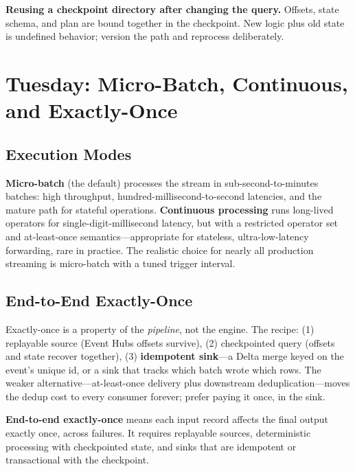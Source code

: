 \begin{pitfall}
\textbf{Reusing a checkpoint directory after changing the query.} Offsets, state schema, and plan are bound together in the checkpoint. New logic plus old state is undefined behavior; version the path and reprocess deliberately.
\end{pitfall}

\section{Tuesday: Micro-Batch, Continuous, and Exactly-Once}

\subsection{Execution Modes}
\textbf{Micro-batch} (the default) processes the stream in sub-second-to-minutes batches: high throughput, hundred-millisecond-to-second latencies, and the mature path for stateful operations. \textbf{Continuous processing} runs long-lived operators for single-digit-millisecond latency, but with a restricted operator set and at-least-once semantics---appropriate for stateless, ultra-low-latency forwarding, rare in practice. The realistic choice for nearly all production streaming is micro-batch with a tuned trigger interval.

\subsection{End-to-End Exactly-Once}
Exactly-once is a property of the \emph{pipeline}, not the engine. The recipe: (1) replayable source (Event Hubs offsets survive), (2) checkpointed query (offsets and state recover together), (3) \textbf{idempotent sink}---a Delta merge keyed on the event's unique id, or a sink that tracks which batch wrote which rows. The weaker alternative---at-least-once delivery plus downstream deduplication---moves the dedup cost to every consumer forever; prefer paying it once, in the sink.

\begin{definitionbox}
\textbf{End-to-end exactly-once} means each input record affects the final output exactly once, across failures. It requires replayable sources, deterministic processing with checkpointed state, and sinks that are idempotent or transactional with the checkpoint.
\end{definitionbox}

